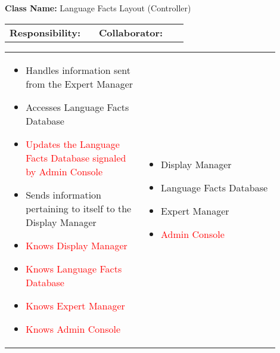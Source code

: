 \begin{cards}[]
    \textbf{Class Name:} Language Facts Layout (Controller)
    \tcbline
    \begin{tabular}{p{0.45\linewidth} | p{0.45\linewidth}}
        \textbf{Responsibility:}& 
        \textbf{Collaborator:}\\
    \end{tabular}
    \tcbline
    \begin{tabular}{p{0.45\linewidth} | p{0.45\linewidth}}
        \begin{itemize}
            \item Handles information sent from the Expert Manager
            \item Accesses Language Facts Database
            \item \textcolor{red}{Updates the Language Facts Database signaled by Admin Console}
            \item Sends information pertaining to itself to the Display Manager
            \item \textcolor{red}{Knows Display Manager}
            \item \textcolor{red}{Knows Language Facts Database}
            \item \textcolor{red}{Knows Expert Manager}
            \item \textcolor{red}{Knows Admin Console}
             
        \end{itemize}
        &
        \begin{itemize}
            \item Display Manager
            \item Language Facts Database
            \item Expert Manager
            \item \textcolor{red}{Admin Console}
            
        \end{itemize}
    \end{tabular}
\end{cards}
